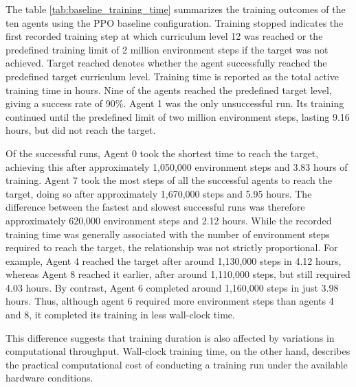 

The table \ref{tab:baseline_training_time} summarizes the training outcomes of the ten agents using the PPO baseline configuration. Training stopped indicates the first recorded training step at which curriculum level 12 was reached or the predefined training limit of 2 million environment steps if the target was not achieved. Target reached denotes whether the agent successfully reached the predefined target curriculum level. Training time is reported as the total active training time in hours. Nine of the agents reached the predefined target level, giving a success rate of 90\%. Agent 1 was the only unsuccessful run. Its training continued until the predefined limit of two million environment steps, lasting 9.16 hours, but did not reach the target.

Of the successful runs, Agent 0 took the shortest time to reach the target, achieving this after approximately 1,050,000 environment steps and 3.83 hours of training. Agent 7 took the most steps of all the successful agents to reach the target, doing so after approximately 1,670,000 steps and 5.95 hours. The difference between the fastest and slowest successful runs was therefore approximately 620,000 environment steps and 2.12 hours. 
While the recorded training time was generally associated with the number of environment steps required to reach the target, the relationship was not strictly proportional. For example, Agent 4 reached the target after around 1,130,000 steps in 4.12 hours, whereas Agent 8 reached it earlier, after around 1,110,000 steps, but still required 4.03 hours. By contrast, Agent 6 completed around 1,160,000 steps in just 3.98 hours. Thus, although agent 6 required more environment steps than agents 4 and 8, it completed its training in less wall-clock time.

This difference suggests that training duration is also affected by variations in computational throughput. 
Wall-clock training time, on the other hand, describes the practical computational cost of conducting a training run under the available hardware conditions.

